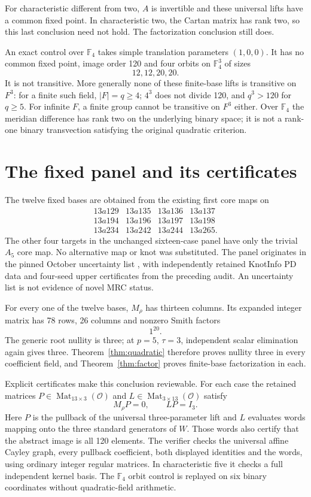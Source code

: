 \documentclass[11pt]{article}
\newcommand{\F}{\mathbb F}
\newcommand{\OO}{\mathcal O}
\begin{document}
For characteristic different from two, $A$ is invertible and these
universal lifts have a common fixed point. In characteristic two,
the Cartan matrix has rank two, so this last conclusion need not
hold. The factorization conclusion still does.

An exact control over $\F_4$ takes simple translation parameters
$(1,0,0)$. It has no common fixed point, image order 120 and four
orbits on $\F_4^3$ of sizes
\[
                              12,12,20,20.
\]
It is not transitive. More generally none of these finite-base lifts
is transitive on $F^3$: for a finite such field, $|F|=q\ge4$;
$4^3$ does not divide 120, and $q^3>120$ for $q\ge5$. For infinite
$F$, a finite group cannot be transitive on $F^3$ either. Over $\F_4$
the meridian difference has rank two on the underlying binary space;
it is not a rank-one binary transvection satisfying the original
quadratic criterion.

\section{The fixed panel and its certificates}

The twelve fixed bases are obtained from the existing first core maps
on
\[
\begin{array}{rrrr}
13a129&13a135&13a136&13a137\\
13a194&13a196&13a197&13a198\\
13a234&13a242&13a244&13a265.
\end{array}
\]
The other four targets in the unchanged sixteen-case panel have only
the trivial $A_5$ core map. No alternative map or knot was substituted.
The panel originates in the pinned October uncertainty list
\cite{deposit}, with independently retained KnotInfo PD data and
four-seed upper certificates from the preceding audit. An uncertainty
list is not evidence of novel MRC status.

For every one of the twelve bases, $M_\rho$ has thirteen columns.
Its expanded integer matrix has 78 rows, 26 columns and nonzero
Smith factors
\[
                                1^{20}.
\]
The generic root nullity is three; at $p=5$, $\tau=3$, independent
scalar elimination again gives three. Theorem~\ref{thm:quadratic}
therefore proves nullity three in every coefficient field, and
Theorem~\ref{thm:factor} proves finite-base factorization in each.

Explicit certificates make this conclusion reviewable. For each
case the retained matrices $P\in\operatorname{Mat}_{13\times3}(\OO)$
and $L\in\operatorname{Mat}_{3\times13}(\OO)$ satisfy
\[
                              M_\rho P=0,\qquad LP=I_3.
\]
Here $P$ is the pullback of the universal three-parameter lift and
$L$ evaluates words mapping onto the three standard generators of
$W$. Those words also certify that the abstract image is all 120
elements. The verifier checks the universal affine Cayley graph,
every pullback coefficient, both displayed identities and the words,
using ordinary integer regular matrices. In characteristic five it
checks a full independent kernel basis. The $\F_4$ orbit control is
replayed on six binary coordinates without quadratic-field arithmetic.
\end{document}
